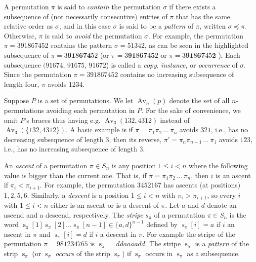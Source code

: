 \documentclass[a4paper]{llncs}
\DeclareMathOperator{\AV}{Av}
\DeclareMathOperator{\stripea}{s}
\newcommand{\stripe}[2]{\stripea_{{#1}}[{#2}]}
\newcommand{\stripew}[1]{\stripea_{{#1}}}
\newcommand{\dstep}{d}
\newcommand{\ustep}{a}
\begin{document}
A permutation $\pi$ is said to \emph{contain} the permutation $\sigma$ 
if there exists a subsequence of (not necessarily consecutive) 
entries of $\pi$ that has the same relative order as $\sigma$, 
and in this case $\sigma$ is said to be a \emph{pattern} of 
$\pi$, written $\sigma \preceq \pi$. 
Otherwise, $\pi$ is said to \emph{avoid} the permutation $\sigma$. 
For example, the permutation $\pi = 391867452$ 
contains the pattern $\sigma = 51342$, 
as can be seen in the highlighted subsequence of 
$\pi = 3\mathbf{9}\mathbf{1}8\mathbf{6}\mathbf{7}\mathbf{4}52$
(or 
$\pi = 3\mathbf{9}\mathbf{1}8\mathbf{6}\mathbf{7}4\mathbf{5}2$
or
$\pi = 3\mathbf{9}\mathbf{1}8\mathbf{6}\mathbf{7}45\mathbf{2}$
). 
Each subsequence $(91674$, 
$91675$, 
$91672$) is called a 
\emph{copy}, 
\emph{instance}, or 
\emph{occurrence} of $\sigma$. 
Since the permutation $\pi = 391867452$  contains no increasing subsequence of length four, $\pi$ avoids $1234$.

Suppose $P$ is a set of permutations. We let $\AV_n(p)$ denote the
set of all $n$-permutations avoiding each permutation in $P$.
For the sake of convenience, we omit $P$'s braces thus having
e.g. $\AV_3(132,4312)$ instead of
$\AV_3(\{132,4312\})$.
A basic example is if 
$\pi = \pi_1\pi_2\,\ldots\,\pi_n$ avoids $321$, i.e., 
has no decreasing subsequence of length $3$, then its reverse, 
$\pi' = \pi_n\pi_{n-1}\,\ldots\,\pi_1$ avoids $123$, i.e., 
has no increasing subsequence of length $3$.

An \emph{ascent} of a permutation $\pi \in S_n$ is any position 
$1 \leq i < n$ where the following value is bigger than the current one. 
That is, if $\pi = \pi_1\pi_2\,\ldots\,\pi_n$, then
$i$ is an ascent if $\pi_i < \pi_{i+1}$.
For example, the permutation 
$345216$7 has ascents (at positions) $1,2,5,6$.
Similarly, a \emph{descent} is a position 
$1 \leq i < n$ with $\pi_i > \pi_{i+1}$, 
so every $i$ with $1 \leq i < n$ either is an ascent or is a descent of 
$\pi$.
Let $\ustep$ and $\dstep$ denote an ascend and a descend, respectively.
The \emph{stripe} $s_\pi$ of a permutation $\pi \in S_n$ is the word
$\stripe{\pi}{1} \stripe{\pi}{2} \ldots \stripe{\pi}{n-1} \in \{\ustep,\dstep\}^{n-1}$ 
defined by 
$ \stripe{\pi}{i}= \ustep$ if $i$ an ascent in $\pi$ and
$\stripe{\pi}{i} = \dstep$ if $i$ a descent in $\pi$.
For example the stripe of the permutation 
$\pi = 981234765$
is $\stripew{\pi} = \dstep\dstep\ustep\ustep\ustep\ustep\dstep\dstep$.
The stripe $\stripew{\sigma}$ is a \emph{pattern} of the strip $\stripew{\pi}$
(or $\stripew{\sigma}$ \emph{occurs} of the strip $\stripew{\pi}$) if $\stripew{\sigma}$ occurs in
$\stripew{\pi}$ as a subsequence.
			
\end{document}
